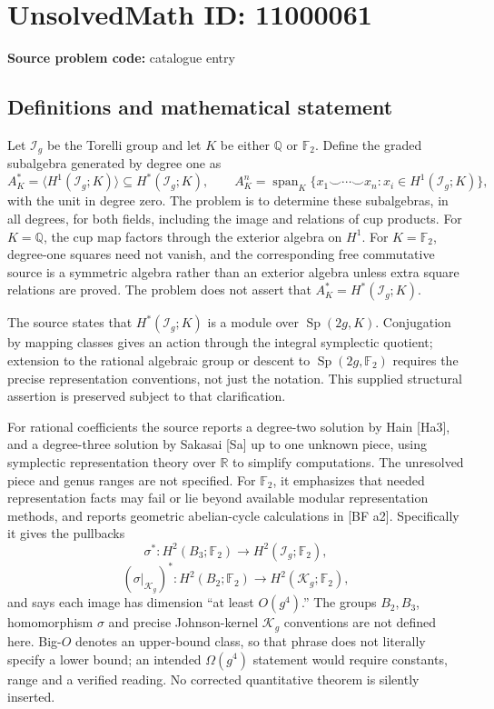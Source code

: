 \documentclass[11pt]{article}
\newcommand{\Q}{\mathbb{Q}}
\newcommand{\R}{\mathbb{R}}
\newcommand{\F}{\mathbb{F}}
\begin{document}
\section*{UnsolvedMath ID: 11000061}
\textbf{Source problem code:} catalogue entry
\subsection{Definitions and mathematical statement}
Let \(\mathcal I_g\) be the Torelli group and let \(K\) be either \(\Q\) or \(\F_2\). Define the graded subalgebra generated by degree one as
\[A_K^*=\langle H^1(\mathcal I_g;K)\rangle\subseteq H^*(\mathcal I_g;K),\qquad
A_K^n=\operatorname{span}_K\{x_1\smile\cdots\smile x_n:x_i\in H^1(\mathcal I_g;K)\},\]
with the unit in degree zero. The problem is to determine these subalgebras, in all degrees, for both fields, including the image and relations of cup products. For \(K=\Q\), the cup map factors through the exterior algebra on \(H^1\). For \(K=\F_2\), degree-one squares need not vanish, and the corresponding free commutative source is a symmetric algebra rather than an exterior algebra unless extra square relations are proved. The problem does not assert that \(A_K^*=H^*(\mathcal I_g;K)\).

The source states that \(H^*(\mathcal I_g;K)\) is a module over \(\operatorname{Sp}(2g,K)\). Conjugation by mapping classes gives an action through the integral symplectic quotient; extension to the rational algebraic group or descent to \(\operatorname{Sp}(2g,\F_2)\) requires the precise representation conventions, not just the notation. This supplied structural assertion is preserved subject to that clarification.

For rational coefficients the source reports a degree-two solution by Hain [Ha3], and a degree-three solution by Sakasai [Sa] up to one unknown piece, using symplectic representation theory over \(\R\) to simplify computations. The unresolved piece and genus ranges are not specified. For \(\F_2\), it emphasizes that needed representation facts may fail or lie beyond available modular representation methods, and reports geometric abelian-cycle calculations in [BF a2]. Specifically it gives the pullbacks
\[\sigma^*:H^2(B_3;\F_2)\to H^2(\mathcal I_g;\F_2),\]
\[(\sigma|_{\mathcal K_g})^*:H^2(B_2;\F_2)\to H^2(\mathcal K_g;\F_2),\]
and says each image has dimension ``at least \(O(g^4)\).'' The groups \(B_2,B_3\), homomorphism \(\sigma\) and precise Johnson-kernel \(\mathcal K_g\) conventions are not defined here. Big-\(O\) denotes an upper-bound class, so that phrase does not literally specify a lower bound; an intended \(\Omega(g^4)\) statement would require constants, range and a verified reading. No corrected quantitative theorem is silently inserted.
\end{document}
